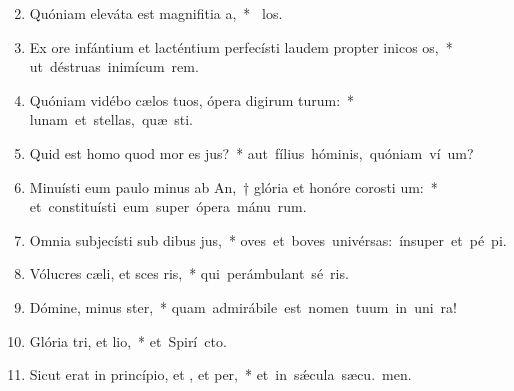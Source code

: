 \begin{flushleft}
\begin{enumerate}[leftmargin=*]
\setcounter{enumi}{1}

\item Quóniam eleváta est magnifitia a,~* \mbox{ los.}

\item Ex ore infántium et lacténtium perfecísti laudem propter inicos os,~* \mbox{ut déstruas inimícum  rem.}

\item Quóniam vidébo cælos tuos, ópera digirum turum:~* \mbox{lunam et stellas, quæ  sti.}

\item Quid est homo quod mor es jus?~* \mbox{aut fílius hóminis, quóniam ví um?}

\item Minuísti eum paulo minus ab An,~† glória et honóre corosti um:~* \mbox{et constituísti eum super ópera mánu rum.}

\item Omnia subjecísti sub dibus jus,~* \mbox{oves et boves univérsas: ínsuper et pé pi.}

\item Vólucres cæli, et sces ris,~* \mbox{qui perámbulant sé ris.}

\item Dómine, minus ster,~* \mbox{quam admirábile est nomen tuum in uni ra!}

\item Glória tri, et lio,~* \mbox{et Spirí cto.}

\item Sicut erat in princípio, et , et per,~* \mbox{et in s\'{\ae}cula sæcu. men.}

\end{enumerate}
\end{flushleft}

